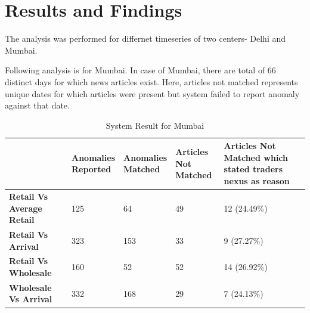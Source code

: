 \documentclass[a4paper,10pt]{article}
\begin{document}
\section{Results and Findings}



The analysis was performed for differnet timeseries of two centers- Delhi and Mumbai.

Following analysis is for Mumbai. In case of Mumbai, there are total of 66 distinct days for which news articles exist. Here, articles not matched represents unique dates for which articles were present but system failed to report anomaly against that date.
\begin{table}[H]
\centering

\begin{tabular}{| L{3cm} | L{3cm} | L{3cm} | L{3cm} | L{3cm} |}
\hline                                 
				  & \textbf{Anomalies \newline Reported} & \textbf{Anomalies \newline Matched}  & \textbf{Articles \newline Not Matched}   & \textbf{Articles Not Matched which stated traders nexus as reason} \\ \hline
\textbf{Retail Vs Average Retail} & 125                         & 64                          &  49                		&  12 (24.49\%)                \\ \hline
\textbf{Retail Vs Arrival}        & 323                         & 153                         &  33                		&  9  (27.27\%)              \\ \hline
\textbf{Retail Vs Wholesale}      & 160                         & 52                          &  52                		&  14 (26.92\%)               \\ \hline
\textbf{Wholesale Vs Arrival}     & 332                         & 168                         &  29                		&  7  (24.13\%)              \\ \hline
\end{tabular}
\caption{System Result for Mumbai}
\label{table:result}
\end{table}
\end{document}
